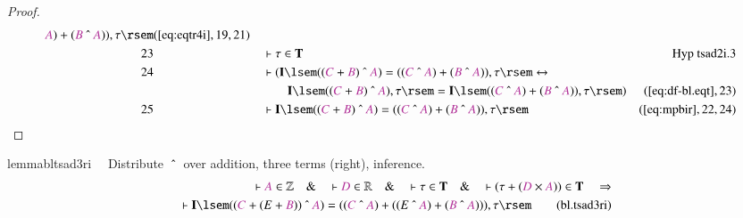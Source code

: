 \begin{proof}
\begin{align}
      \mc{A} ) + ( \mc{B} ~\string^~ \mc{A} ) ) , \tau
      \rsem&(\mbox{\ref{eq:eqtr4i}},19,21)\notag
  \\ 23 &&  & \vdash \tau \in \mathbf{T}&\text{Hyp~tsad2i.3}\notag%
  \\ 24 &&  & \vdash ( \mathbf{I} \lsem ( ( \mc{C} + \mc{B} ) ~\string^~ \mc{A}
      ) = ( ( \mc{C} ~\string^~ \mc{A} ) + ( \mc{B}
      ~\string^~ \mc{A} ) ) , \tau \rsem \leftrightarrow \notag \\ & & & \qquad
      \mathbf{I} \lsem ( ( \mc{C} + \mc{B} ) ~\string^~
      \mc{A} ) , \tau \rsem = \mathbf{I} \lsem ( ( \mc{C}
      ~\string^~ \mc{A} ) + ( \mc{B} ~\string^~ \mc{A} ) )
      , \tau \rsem )&(\mbox{\ref{eq:df-bl.eqt}},23)\notag
  \\ 25 &&  & \vdash \mathbf{I} \lsem ( ( \mc{C} + \mc{B} ) ~\string^~ \mc{A} )
      = ( ( \mc{C} ~\string^~ \mc{A} ) + ( \mc{B}
      ~\string^~ \mc{A} ) ) , \tau
      \rsem&(\mbox{\ref{eq:mpbir}},22,24)\notag
\end{align}
\end{proof}

\begin{restatable}{lemma}{bltsad3ri}~~ Distribute $~\string^~$ over addition,
three terms (right), inference.
\begin{align}
\vdash \mc{A} \in \mathbb{Z}\quad\&\quad \vdash \mc{D} \in
    \mathbb{R}\quad\&\quad \vdash \tau \in \mathbf{T}\quad\&\quad \vdash ( \tau
    + ( \mc{D} \times \mc{A} ) ) \in \mathbf{T}\quad\Rightarrow \notag \\ %
     \quad \vdash
    \mathbf{I} \lsem ( ( \mc{C} + ( E + \mc{B} ) ) ~\string^~ \mc{A} ) = ( (
    \mc{C} ~\string^~ \mc{A} ) + ( ( E ~\string^~ \mc{A} ) + ( \mc{B}
    ~\string^~ \mc{A} ) ) ) , \tau \rsem\label{eq:bl.tsad3ri}\tag{bl.tsad3ri}
\end{align}
\end{restatable}

